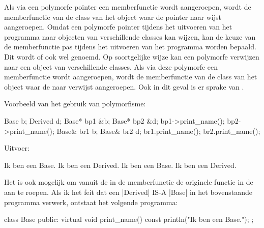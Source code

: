 \begin{cpplstShortInline}
{}
\makeatletter\let\Hy@footnote@currentHref\saved@Href@F\makeatother
{}
\xdef\BackrefFootnoteTag{bhfn:\theBackrefHyperFootnoteCounter}
Als via een polymorfe pointer een memberfunctie wordt aangeroepen, wordt de memberfunctie van de class van het object waar de pointer naar wijst aangeroepen.
Omdat een polymorfe pointer tijdens het uitvoeren van het programma naar objecten van verschillende classes kan wijzen, kan de keuze van de memberfunctie pas tijdens het uitvoeren van het programma worden bepaald.
Dit wordt \emph{} of ook wel \emph{} genoemd.
Op soortgelijke wijze kan een polymorfe  verwijzen naar een object van verschillende classes.
Als via deze polymorfe  een memberfunctie wordt aangeroepen, wordt de memberfunctie van de class van het object waar de  naar verwijst aangeroepen.
Ook in dit geval is er sprake van \emph{}.

Voorbeeld van het gebruik van polymorfisme:
\begin{cpplstfragment}
Base b;
Derived d;
Base* bp1 {&b};
Base* bp2 {&d};
bp1->print_name();
bp2->print_name();
Base& br1 {b};
Base& br2 {d};
br1.print_name();
br2.print_name();
\end{cpplstfragment}

Uitvoer:
\begin{coutput}
Ik ben een Base.
Ik ben een Derived.
Ik ben een Base.
Ik ben een Derived.
\end{coutput}

Het is ook mogelijk om vanuit de in de   memberfunctie de originele functie in de  aan te roepen.
Als ik het feit dat een |Derived| IS-A |Base| in het bovenstaande programma verwerk, ontstaat het volgende programma:
\begin{cpplstfragment}
class Base {
public:
    virtual void print_name() const {
        println("Ik ben een Base.");
    }
};


\end{cpplstfragment}
\end{cpplstShortInline}
